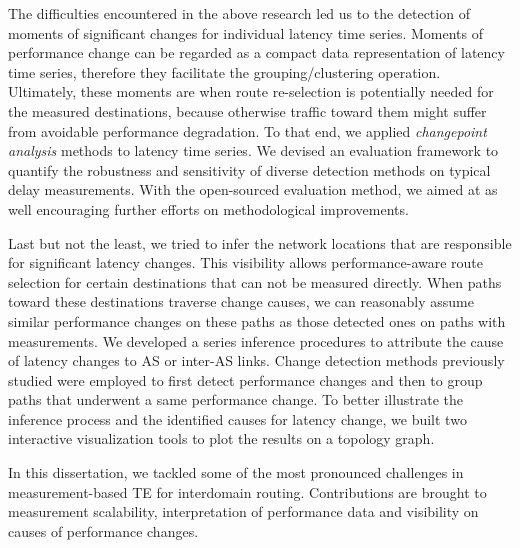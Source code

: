 The difficulties encountered in the above research led us to the detection of moments of significant changes for individual latency time series.
Moments of performance change can be regarded as a compact data representation of latency time series, therefore they facilitate the grouping/clustering operation.
Ultimately, these moments are when route re-selection is potentially needed for the measured destinations, because otherwise traffic toward them might suffer from avoidable performance degradation.
To that end, we applied \textit{changepoint analysis} methods to latency time series.
We devised an evaluation framework to quantify the robustness and sensitivity of diverse detection methods on typical delay measurements.
With the open-sourced evaluation method, we aimed at as well encouraging further efforts on methodological improvements.

Last but not the least, we tried to infer the network locations that are responsible for significant latency changes. This visibility allows performance-aware route selection for certain destinations that can not be measured directly.
When paths toward these destinations traverse change causes, we can reasonably assume similar performance changes on these paths as those detected ones on paths with measurements.
We developed a series inference procedures to attribute the cause of latency changes to \acf{AS} or inter-AS links.
Change detection methods previously studied were employed to first detect performance changes and then to group paths that underwent a same performance change.
To better illustrate the inference process and the identified causes for latency change, we built two interactive visualization tools to plot the results on a topology graph.

In this dissertation, we tackled some of the most pronounced challenges in measurement-based TE for interdomain routing. Contributions are brought to measurement scalability, interpretation of performance data and visibility on causes of performance changes. 
\vfill

\iffalse
\begin{otherlanguage}{french}
\pdfbookmark[1]{Résumé}{Résumé}
\chapter*{Résumé}
Le résume en français...
\end{otherlanguage}
\fi

\endgroup			

